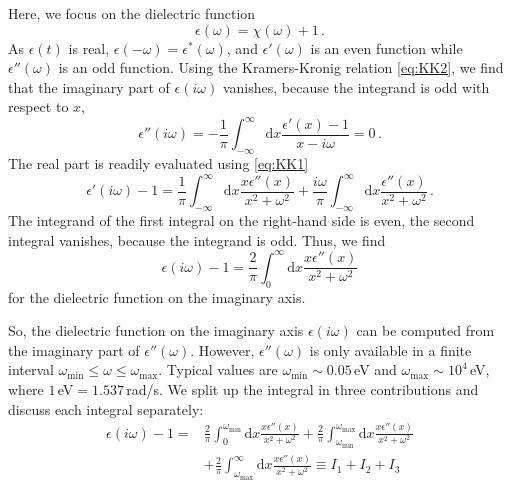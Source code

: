 \documentclass[twocolumn,superscriptaddress,pre]{revtex4-1}
\begin{document}
Here, we focus on the dielectric function
\begin{equation}
\epsilon(\omega)=\chi(\omega)+1 \,.
\end{equation}
As $\epsilon(t)$ is real, $\epsilon(-\omega) = \epsilon^*(\omega)$, and
$\epsilon'(\omega)$ is an even function while $\epsilon''(\omega)$ is an odd
function. Using the Kramers-Kronig relation \eqref{eq:KK2}, we find that the
imaginary part of $\epsilon(i\omega)$ vanishes, because the integrand is odd
with respect to $x$,
\begin{equation}
\epsilon''(i\omega) = - \frac{1}{\pi} \int_{-\infty}^\infty \mathrm{d}x \frac{\epsilon'(x)-1}{x-i\omega} = 0 \,.
\end{equation}
The real part is readily evaluated using \eqref{eq:KK1}
\begin{equation}
\epsilon'(i\omega)-1 = \frac{1}{\pi} \int_{-\infty}^\infty \mathrm{d}x \frac{x\epsilon''(x)}{x^2+\omega^2} + \frac{i\omega}{\pi} \int_{-\infty}^\infty \mathrm{d}x \frac{\epsilon''(x)}{x^2+\omega^2} \,. 
\end{equation}
The integrand of the first integral on the right-hand side is even, the second integral vanishes, because the integrand is odd. Thus, we find
\begin{equation}
\epsilon(i\omega)-1 = \frac{2}{\pi} \int_0^\infty \mathrm{d}x \frac{x\epsilon''(x)}{x^2+\omega^2}
\end{equation}
for the dielectric function on the imaginary axis.

So, the dielectric function on the imaginary axis $\epsilon(i\omega)$ can be
computed from the imaginary part of $\epsilon''(\omega)$. However,
$\epsilon''(\omega)$ is only available in a finite interval
$\omega_\mathrm{min} \le \omega \le \omega_\mathrm{max}$. Typical values are $\omega_\mathrm{min} \sim 0.05\,$eV
and $\omega_\mathrm{max} \sim 10^4\,$eV, where $1\,$eV$=1.537\,$rad/s.
We split up the
integral in three contributions and discuss each integral separately:
\begin{align}
\nonumber
\epsilon(i\omega)-1 =&
\frac{2}{\pi} \int_0^{\omega_\mathrm{min}} \mathrm{d}x \frac{x\epsilon''(x)}{x^2+\omega^2} +
\frac{2}{\pi} \int_{\omega_\mathrm{min}}^{\omega_\mathrm{max}} \mathrm{d}x \frac{x\epsilon''(x)}{x^2+\omega^2} \\
&+\frac{2}{\pi} \int_{\omega_\mathrm{max}}^\infty \mathrm{d}x \frac{x\epsilon''(x)}{x^2+\omega^2} \equiv I_1 + I_2 + I_3
\end{align}
\end{document}
